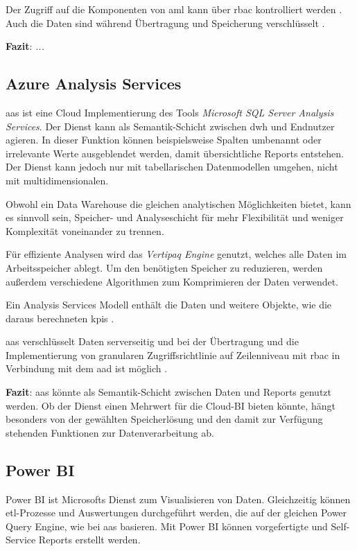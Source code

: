 Der Zugriff auf die Komponenten von \ac{aml} kann über \ac{rbac} kontrolliert werden \cite{wu_manage_2021}. Auch die Daten sind während Übertragung und Speicherung verschlüsselt \cite{hirono_data_2021}.

\textbf{Fazit}: \textit{...}


\subsection{Azure Analysis Services} \label{sec:grundlagen:azure_dienste:analysisServices}
\ac{aas} ist eine Cloud Implementierung des Tools \textit{Microsoft SQL Server Analysis Services}. Der Dienst kann als Semantik-Schicht zwischen \ac{dwh} und Endnutzer agieren. In dieser Funktion können beispielsweise Spalten umbenannt oder irrelevante Werte ausgeblendet werden, damit übersichtliche Reports entstehen. Der Dienst kann jedoch nur mit tabellarischen Datenmodellen umgehen, nicht mit multidimensionalen.

Obwohl ein Data Warehouse die gleichen analytischen Möglichkeiten bietet, kann es sinnvoll sein, Speicher- und Analyseschicht für mehr Flexibilität und weniger Komplexität voneinander zu trennen.

Für effiziente Analysen wird das \textit{Vertipaq Engine} genutzt, welches alle Daten im Arbeitsspeicher ablegt. Um den benötigten Speicher zu reduzieren, werden außerdem verschiedene Algorithmen zum Komprimieren der Daten verwendet.

Ein Analysis Services Modell enthält die Daten und weitere Objekte, wie die daraus berechneten \acp{kpi} \cite{how_beyond_2020}.

\ac{aas} verschlüsselt Daten serverseitig und bei der Übertragung und die Implementierung von granularen Zugriffsrichtlinie auf Zeilenniveau mit \ac{rbac} in Verbindung mit dem \ac{aad} ist möglich \cite{duncan_what_2021}.

\textbf{Fazit}: \ac{aas} könnte als Semantik-Schicht zwischen Daten und Reports genutzt werden. Ob der Dienst einen Mehrwert für die Cloud-BI bieten könnte, hängt besonders von der gewählten Speicherlösung und den damit zur Verfügung stehenden Funktionen zur Datenverarbeitung ab.


\subsection{Power BI} \label{sec:grundlagen:azure_dienste:powerBI}
Power BI ist Microsofts Dienst zum Visualisieren von Daten. Gleichzeitig können \ac{etl}-Prozesse und Auswertungen durchgeführt werden, die auf der gleichen Power Query Engine, wie bei \ac{aas} basieren. Mit Power BI können vorgefertigte und Self-Service Reports erstellt werden.

